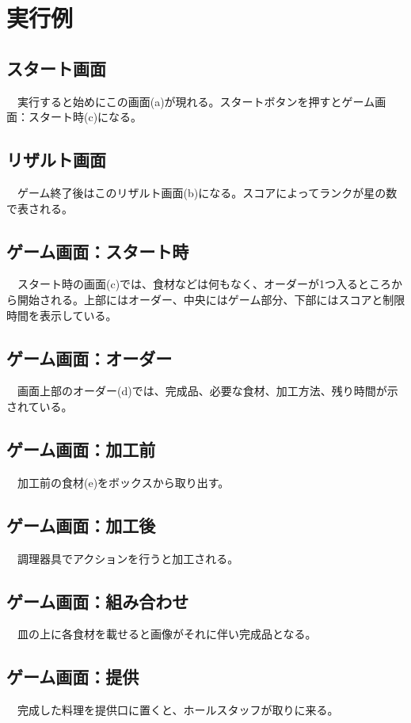 \documentclass[a4j]{jarticle} %
\begin{document}
\section{実行例}
\subsection*{スタート画面}
　実行すると始めにこの画面(a)が現れる。スタートボタンを押すとゲーム画面：スタート時(c)になる。
\subsection*{リザルト画面}
　ゲーム終了後はこのリザルト画面(b)になる。スコアによってランクが星の数で表される。
\subsection*{ゲーム画面：スタート時}
　スタート時の画面(c)では、食材などは何もなく、オーダーが1つ入るところから開始される。上部にはオーダー、中央にはゲーム部分、下部にはスコアと制限時間を表示している。
\subsection*{ゲーム画面：オーダー}
　画面上部のオーダー(d)では、完成品、必要な食材、加工方法、残り時間が示されている。
\subsection*{ゲーム画面：加工前}
　加工前の食材(e)をボックスから取り出す。
\subsection*{ゲーム画面：加工後}
　調理器具でアクションを行うと加工される。
\subsection*{ゲーム画面：組み合わせ}
　皿の上に各食材を載せると画像がそれに伴い完成品となる。
\subsection*{ゲーム画面：提供}
　完成した料理を提供口に置くと、ホールスタッフが取りに来る。
\end{document}
